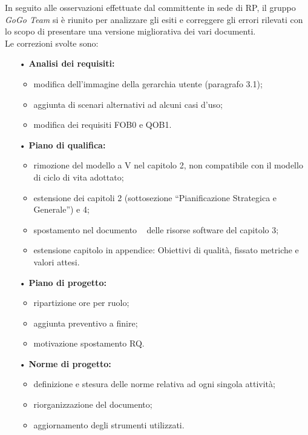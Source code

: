 {{{	In seguito alle osservazioni effettuate dal committente in sede di RP, il gruppo
	\textit{GoGo Team} si è riunito per analizzare gli esiti e correggere gli errori 
	rilevati con lo scopo di presentare una versione migliorativa dei vari
	documenti.\\
	Le correzioni svolte sono:
		\begin{itemize}
		
			\item[•] \textbf{Analisi dei requisiti:}
				\begin{itemize}
					\item modifica dell'immagine della gerarchia utente  (paragrafo 3.1);
					\item aggiunta di scenari alternativi ad alcuni casi d'uso;
					\item modifica dei requisiti FOB0 e QOB1.
				\end{itemize}
			
			\item[•] \textbf{Piano di qualifica:}
				\begin{itemize}
					\item rimozione del modello a V nel capitolo 2, non compatibile con il modello di ciclo di
					      vita adottato;
					\item estensione dei capitoli 2 (sottosezione ``Pianificazione Strategica e Generale'') e 4;
					\item spostamento nel documento \NormeDiProgetto~ delle risorse software del capitolo 3;
					\item estensione capitolo in appendice: Obiettivi di qualità, fissato metriche e valori attesi.
				\end{itemize}
			
			\item[•] \textbf{Piano di progetto:}
				\begin{itemize}
					\item ripartizione ore per ruolo;
					\item aggiunta preventivo a finire;
					\item motivazione spostamento RQ.
				\end{itemize}
			
			\item[•] \textbf{Norme di progetto:}
				\begin{itemize}
					\item definizione e stesura delle norme relativa ad ogni singola attività;
					\item riorganizzazione del documento;
					\item aggiornamento degli strumenti utilizzati.
				\end{itemize}
			

\end{itemize}}}}
